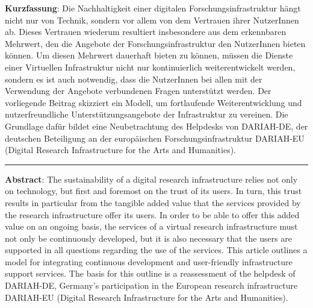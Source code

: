 \textbf{Kurzfassung}: Die Nachhaltigkeit einer digitalen
Forschungsinfrastruktur hängt nicht nur von Technik, sondern vor allem
von dem Vertrauen ihrer NutzerInnen ab. Dieses Vertrauen wiederum
resultiert insbesondere aus dem erkennbaren Mehrwert, den die Angebote
der Forschungsinfrastruktur den NutzerInnen bieten können. Um diesen
Mehrwert dauerhaft bieten zu können, müssen die Dienste einer Virtuellen
Infrastruktur nicht nur kontinuierlich weiterentwickelt werden, sondern
es ist auch notwendig, dass die NutzerInnen bei allen mit der Verwendung
der Angebote verbundenen Fragen unterstützt werden. Der vorliegende
Beitrag skizziert ein Modell, um fortlaufende Weiterentwicklung und
nutzerfreundliche Unterstützungsangebote der Infrastruktur zu vereinen.
Die Grundlage dafür bildet eine Neubetrachtung des Helpdesks von
DARIAH-DE, der deutschen Beteiligung an der europäischen
Forschungsinfrastruktur DARIAH-EU (Digital Research Infrastructure for
the Arts and Humanities).

\begin{center}\rule{0.5\linewidth}{\linethickness}\end{center}

\textbf{Abstract}: The sustainability of a digital research
infrastructure relies not only on technology, but first and foremost on
the trust of its users. In turn, this trust results in particular from
the tangible added value that the services provided by the research
infrastructure offer its users. In order to be able to offer this added
value on an ongoing basis, the services of a virtual research
infrastructure must not only be continuously developed, but it is also
necessary that the users are supported in all questions regarding the
use of the services. This article outlines a model for integrating
continuous development and user-friendly infrastructure support
services. The basis for this outline is a reassessment of the helpdesk
of DARIAH-DE, Germany's participation in the European research
infrastructure DARIAH-EU (Digital Research Infrastructure for the Arts
and Humanities).
